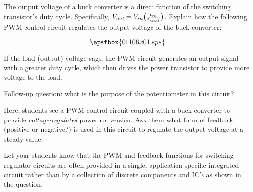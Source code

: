 

The output voltage of a buck converter is a direct function of the switching transistor's duty cycle.  Specifically, $V_{out} = V_{in}\bigl({t_{on} \over t_{total}}\bigr)$.  Explain how the following PWM control circuit regulates the output voltage of the buck converter:

$$\epsfbox{01106x01.eps}$$







If the load (output) voltage sags, the PWM circuit generates an output signal with a greater duty cycle, which then drives the power transistor to provide more voltage to the load.

\vskip 10pt

Follow-up question: what is the purpose of the potentiometer in this circuit?







Here, students see a PWM control circuit coupled with a buck converter to provide {\it voltage-regulated} power conversion.  Ask them what form of feedback (positive or negative?) is used in this circuit to regulate the output voltage at a steady value.

Let your students know that the PWM and feedback functions for switching regulator circuits are often provided in a single, application-specific integrated circuit rather than by a collection of discrete components and IC's as shown in the question.




